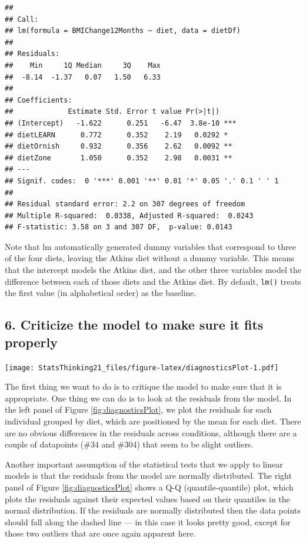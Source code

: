 \documentclass[12pt,]{book}
\theoremstyle{definition}
\theoremstyle{definition}
\theoremstyle{definition}
\theoremstyle{remark}
\begin{document}
\begin{verbatim}
## 
## Call:
## lm(formula = BMIChange12Months ~ diet, data = dietDf)
## 
## Residuals:
##    Min     1Q Median     3Q    Max 
##  -8.14  -1.37   0.07   1.50   6.33 
## 
## Coefficients:
##             Estimate Std. Error t value Pr(>|t|)    
## (Intercept)   -1.622      0.251   -6.47  3.8e-10 ***
## dietLEARN      0.772      0.352    2.19   0.0292 *  
## dietOrnish     0.932      0.356    2.62   0.0092 ** 
## dietZone       1.050      0.352    2.98   0.0031 ** 
## ---
## Signif. codes:  0 '***' 0.001 '**' 0.01 '*' 0.05 '.' 0.1 ' ' 1
## 
## Residual standard error: 2.2 on 307 degrees of freedom
## Multiple R-squared:  0.0338, Adjusted R-squared:  0.0243 
## F-statistic: 3.58 on 3 and 307 DF,  p-value: 0.0143
\end{verbatim}

Note that lm automatically generated dummy variables that correspond to three of the four diets, leaving the Atkins diet without a dummy variable. This means that the intercept models the Atkins diet, and the other three variables model the difference between each of those diets and the Atkins diet. By default, \texttt{lm()} treats the first value (in alphabetical order) as the baseline.

\hypertarget{criticize-the-model-to-make-sure-it-fits-properly}{%
\subsection{6. Criticize the model to make sure it fits properly}\label{criticize-the-model-to-make-sure-it-fits-properly}}

\texttt{[image: StatsThinking21\_files/figure-latex/diagnosticsPlot-1.pdf]}

The first thing we want to do is to critique the model to make sure that it is appropriate. One thing we can do is to look at the residuals from the model. In the left panel of Figure \ref{fig:diagnosticsPlot}, we plot the residuals for each individual grouped by diet, which are positioned by the mean for each diet.
There are no obvious differences in the residuals across conditions, although there are a couple of datapoints (\#34 and \#304) that seem to be slight outliers.

Another important assumption of the statistical tests that we apply to linear models is that the residuals from the model are normally distributed. The right panel of Figure \ref{fig:diagnosticsPlot} shows a Q-Q (quantile-quantile) plot, which plots the residuals against their expected values based on their quantiles in the normal distribution. If the residuals are normally distributed then the data points should fall along the dashed line --- in this case it looks pretty good, except for those two outliers that are once again apparent here.
\end{document}
